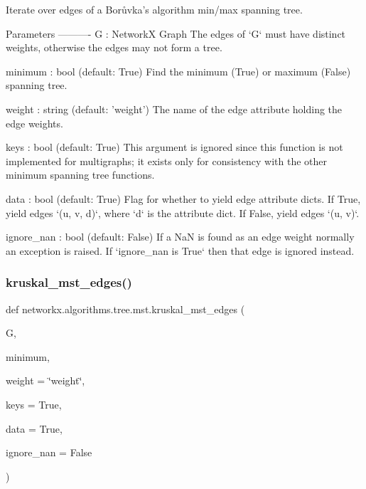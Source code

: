 \begin{DoxyVerb}Iterate over edges of a Borůvka's algorithm min/max spanning tree.

Parameters
----------
G : NetworkX Graph
    The edges of `G` must have distinct weights,
    otherwise the edges may not form a tree.

minimum : bool (default: True)
    Find the minimum (True) or maximum (False) spanning tree.

weight : string (default: 'weight')
    The name of the edge attribute holding the edge weights.

keys : bool (default: True)
    This argument is ignored since this function is not
    implemented for multigraphs; it exists only for consistency
    with the other minimum spanning tree functions.

data : bool (default: True)
    Flag for whether to yield edge attribute dicts.
    If True, yield edges `(u, v, d)`, where `d` is the attribute dict.
    If False, yield edges `(u, v)`.

ignore_nan : bool (default: False)
    If a NaN is found as an edge weight normally an exception is raised.
    If `ignore_nan is True` then that edge is ignored instead.\end{DoxyVerb}
 \mbox{\label{namespacenetworkx_1_1algorithms_1_1tree_1_1mst_a625cf66f46805703dd2c3fd26a33c689}} 
\subsubsection{\texorpdfstring{kruskal\+\_\+mst\+\_\+edges()}{kruskal\_mst\_edges()}}
{\footnotesize\ttfamily def networkx.\+algorithms.\+tree.\+mst.\+kruskal\+\_\+mst\+\_\+edges (\begin{DoxyParamCaption}\item[{}]{G,  }\item[{}]{minimum,  }\item[{}]{weight = {\ttfamily \char`\"{}weight\char`\"{}},  }\item[{}]{keys = {\ttfamily True},  }\item[{}]{data = {\ttfamily True},  }\item[{}]{ignore\+\_\+nan = {\ttfamily False} }\end{DoxyParamCaption})}

